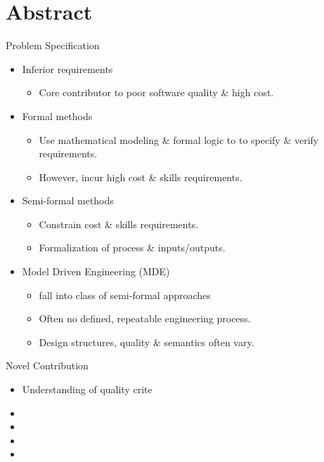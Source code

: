 \section{Abstract}

\begin{frame}{Problem Specification}
\initclock

  \begin{itemize}
    \item<+-| alert@+> Inferior requirements
      \begin{itemize}
      	\item Core contributor to poor software quality \& high cost.
      \end{itemize}
    \item<+-| alert@+> Formal methods
      \begin{itemize}
	      \item Use mathematical modeling \& formal logic to to specify \& verify requirements.
    	  \item However, incur high cost \& skills requirements.
      \end{itemize}
    \item<+-| alert@+> Semi-formal methods
      \begin{itemize}
		\item Constrain cost \& skills requirements.
		\item Formalization of process \& inputs/outputs.
	  \end{itemize}		
   \item<+-| alert@+> Model Driven Engineering (MDE)
   	  \begin{itemize}
   	  	\item fall into class of semi-formal approaches
		\item Often no defined, repeatable engineering process.
		\item Design structures, quality \& semantics often vary.
	  \end{itemize}	
  \end{itemize}

\end{frame}


\begin{frame}{Novel Contribution}

  \begin{itemize}
   \item<+-| alert@+> Understanding of quality crite
   \item<+-| alert@+> 
   \item<+-| alert@+> 
   \item<+-| alert@+> 
   \item<+-| alert@+> 
  \end{itemize}

\end{frame}

